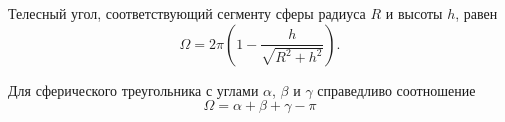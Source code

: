 Телесный угол, соответствующий сегменту сферы радиуса $R$ и высоты $h$, равен
\begin{equation}
	\Omega = 2 \pi \left(1 - \dfrac{h}{\sqrt{R^2 + h^2}}\right).
\end{equation}

Для сферического треугольника с углами $\alpha$, $\beta$ и $\gamma$ справедливо соотношение
\begin{equation}
	\Omega = \alpha + \beta + \gamma - \pi
\end{equation}
